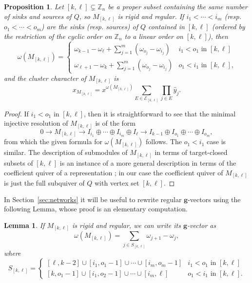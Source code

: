 \documentclass[12pt]{amsart}
\newcommand{\ZZ}{\mathbb{Z}}
\newcommand{\bfg}{\mathbf{g}}
\newcommand{\gv}{\omega}
\newcommand{\grep}{\gv}
\newcommand{\cE}{\mathcal{E}}
\newcommand{\Qrep}{M}
\newtheorem{lemma}[theorem]{Lemma}
\newtheorem{proposition}[theorem]{Proposition}
\theoremstyle{remark}
\numberwithin{equation}{section}
\numberwithin{figure}{section}
\begin{document}
\begin{proposition}
  \label{prop:regular coindices}
  Let $[k,\ell] \subsetneq \ZZ_n$ be a proper subset containing the same number of sinks and sources of $Q$, so $\Qrep_{[k,\ell]}$ is rigid and regular.
  If $i_1 < \cdots < i_m$ (resp. $o_1 < \cdots < o_m$) are the sinks (resp. sources) of $Q$ contained in $[k,\ell]$ (ordered by the restriction of the cyclic order on $\ZZ_n$ to a linear order on $[k,\ell]$), then
  \[
    \grep(\Qrep_{[k,\ell]})
    =
    \begin{cases}
      \omega_{k-1}-\omega_\ell+\sum_{j=1}^m (\omega_{o_j}-\omega_{i_j}) & \text{$i_1<o_1$ in $[k,\ell]$}\\
      \omega_{\ell+1}-\omega_k+\sum_{j=1}^m (\omega_{o_j}-\omega_{i_j}) & \text{$o_1 < i_1$ in $[k,\ell]$,}
    \end{cases}
  \]
  and the cluster character of $\Qrep_{[k,\ell]}$ is
  \begin{equation}
    \label{eq:regular cluster characters}
    x_{\Qrep_{[k,\ell]}}
    =
    x^{\grep(\Qrep_{[k,\ell]})} \sum_{E \in \cE_{[k,\ell]}} \prod_{j \in E} \hat{y}_j.
  \end{equation}
\end{proposition}
\begin{proof}
  If $i_1 < o_1$ in $[k,\ell]$, then it is straightforward to see that the minimal injective resolution of $\Qrep_{[k,\ell]}$ is of the form
  \[
    0
    \to
    \Qrep_{[k,\ell]}
    \to
    I_{i_1} \oplus \cdots \oplus I_{i_m}\oplus I_\ell
    \to
    I_{k-1} \oplus I_{o_1} \oplus \cdots \oplus I_{o_m},
  \]
  from which the given formula for $\grep(\Qrep_{[k,\ell]})$ follows.
  The $o_1 < i_1$ case is similar.
  The description of submodules of $\Qrep_{[k,\ell]}$ in terms of target-closed subsets of $[k,\ell]$ is an instance of a more general description in terms of the coefficient quiver of a representation \cite{CI11,Rin98}; in our case the coefficient quiver of $\Qrep_{[k,\ell]}$ is just the full subquiver of $Q$ with vertex set $[k,\ell]$.
\end{proof}

In Section~\ref{sec:networks} it will be useful to rewrite regular $\bfg$-vectors using the following Lemma, whose proof is an elementary computation.

\begin{lemma}
  \label{lem:regulargvectors}
  If $\Qrep_{[k,\ell]}$ is rigid and regular, we can write its $\bfg$-vector as
  \[
    \grep(\Qrep_{[k,\ell]})=\sum_{j\in S_{[k,\ell]}} \omega_{j+1} - \omega_j,
  \]
  where
  \[
    S_{[k,\ell]}
    =
    \begin{cases}
      [\ell,k-2] \cup [i_1, o_1 -1] \cup \cdots \cup [i_m, o_m - 1] & \text{$i_1<o_1$ in $[k,\ell]$}\\
      [k,o_1-1] \cup [i_1,o_2-1] \cup \cdots \cup [i_m,\ell] & \text{$o_1 < i_1$ in $[k,\ell]$.}
    \end{cases}
  \]
\end{lemma}
\end{document}
